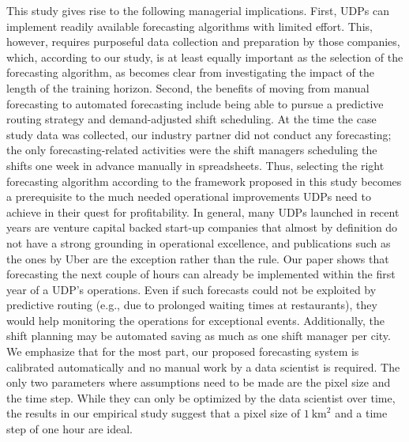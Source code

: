 This study gives rise to the following managerial implications.
First, UDPs can implement readily available forecasting algorithms with limited
    effort.
This, however, requires purposeful data collection and preparation by those
    companies, which, according to our study, is at least equally important as
    the selection of the forecasting algorithm, as becomes clear from 
    investigating the impact of the length of the training horizon.
Second, the benefits of moving from manual forecasting to automated forecasting
    include being able to pursue a predictive routing strategy and
    demand-adjusted shift scheduling.
At the time the case study data was collected, our industry partner did not
    conduct any forecasting; the only forecasting-related activities were the
    shift managers scheduling the shifts one week in advance manually in 
    spreadsheets.
Thus, selecting the right forecasting algorithm according to the framework
    proposed in this study becomes a prerequisite to the much needed
    operational improvements UDPs need to achieve in their quest for
    profitability.
In general, many UDPs launched in recent years are venture capital backed
    start-up companies that almost by definition do not have a strong
    grounding in operational excellence, and publications such as the ones by
    Uber are the exception rather than the rule.
Our paper shows that forecasting the next couple of hours can already be
    implemented within the first year of a UDP's operations.
Even if such forecasts could not be exploited by predictive routing (e.g., due
    to prolonged waiting times at restaurants), they would help monitoring the
    operations for exceptional events.
Additionally, the shift planning may be automated saving as much as one shift
    manager per city.
We emphasize that for the most part, our proposed forecasting system
    is calibrated automatically and no manual work by a data scientist is required.
The only two parameters where assumptions need to be made are the pixel size
    and the time step.
While they can only be optimized by the data scientist over time, the results in our
    empirical study suggest that a pixel size of $1~\text{km}^2$ and a time step of
    one hour are ideal.